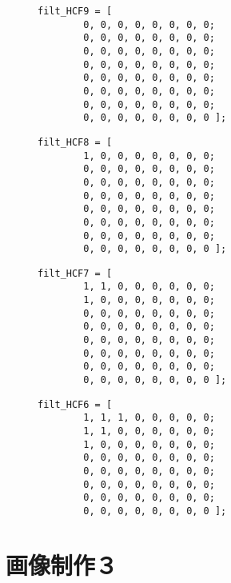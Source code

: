 \documentclass[a4j]{jsarticle}
\begin{document}
\begin{figure}
  \begin{verbatim}
filt_HCF9 = [
        0, 0, 0, 0, 0, 0, 0, 0;
        0, 0, 0, 0, 0, 0, 0, 0;
        0, 0, 0, 0, 0, 0, 0, 0;
        0, 0, 0, 0, 0, 0, 0, 0;
        0, 0, 0, 0, 0, 0, 0, 0;
        0, 0, 0, 0, 0, 0, 0, 0;
        0, 0, 0, 0, 0, 0, 0, 0;
        0, 0, 0, 0, 0, 0, 0, 0 ];
  \end{verbatim}
\end{figure}

\begin{figure}
  \begin{verbatim}
filt_HCF8 = [
        1, 0, 0, 0, 0, 0, 0, 0;
        0, 0, 0, 0, 0, 0, 0, 0;
        0, 0, 0, 0, 0, 0, 0, 0;
        0, 0, 0, 0, 0, 0, 0, 0;
        0, 0, 0, 0, 0, 0, 0, 0;
        0, 0, 0, 0, 0, 0, 0, 0;
        0, 0, 0, 0, 0, 0, 0, 0;
        0, 0, 0, 0, 0, 0, 0, 0 ];
  \end{verbatim}
\end{figure}

\begin{figure}
  \begin{verbatim}
filt_HCF7 = [
        1, 1, 0, 0, 0, 0, 0, 0;
        1, 0, 0, 0, 0, 0, 0, 0;
        0, 0, 0, 0, 0, 0, 0, 0;
        0, 0, 0, 0, 0, 0, 0, 0;
        0, 0, 0, 0, 0, 0, 0, 0;
        0, 0, 0, 0, 0, 0, 0, 0;
        0, 0, 0, 0, 0, 0, 0, 0;
        0, 0, 0, 0, 0, 0, 0, 0 ];
  \end{verbatim}
\end{figure}

\begin{figure}
  \begin{verbatim}
filt_HCF6 = [
        1, 1, 1, 0, 0, 0, 0, 0;
        1, 1, 0, 0, 0, 0, 0, 0;
        1, 0, 0, 0, 0, 0, 0, 0;
        0, 0, 0, 0, 0, 0, 0, 0;
        0, 0, 0, 0, 0, 0, 0, 0;
        0, 0, 0, 0, 0, 0, 0, 0;
        0, 0, 0, 0, 0, 0, 0, 0;
        0, 0, 0, 0, 0, 0, 0, 0 ];
  \end{verbatim}
\end{figure}

\section{画像制作３}
\end{document}
